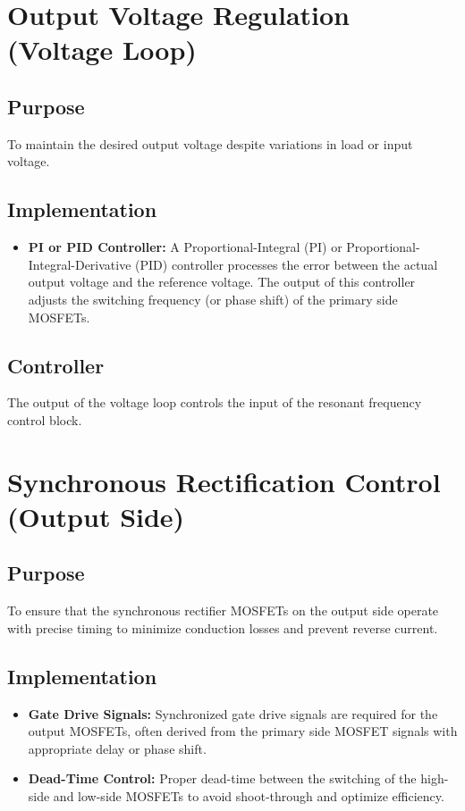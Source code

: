 \documentclass{article}
\begin{document}
\section{Output Voltage Regulation (Voltage Loop)}
\label{sec:output_voltage_regulation}
\subsection{Purpose}
To maintain the desired output voltage despite variations in load or input voltage.

\subsection{Implementation}
\begin{itemize}
    \item \textbf{PI or PID Controller:} A Proportional-Integral (PI) or Proportional-Integral-Derivative (PID) controller processes the error between the actual output voltage and the reference voltage. The output of this controller adjusts the switching frequency (or phase shift) of the primary side MOSFETs.
\end{itemize}

\subsection{Controller}
The output of the voltage loop controls the input of the resonant frequency control block.

\section{Synchronous Rectification Control (Output Side)}
\label{sec:synchronous_rectification_control}
\subsection{Purpose}
To ensure that the synchronous rectifier MOSFETs on the output side operate with precise timing to minimize conduction losses and prevent reverse current.

\subsection{Implementation}
\begin{itemize}
    \item \textbf{Gate Drive Signals:} Synchronized gate drive signals are required for the output MOSFETs, often derived from the primary side MOSFET signals with appropriate delay or phase shift.
    \item \textbf{Dead-Time Control:} Proper dead-time between the switching of the high-side and low-side MOSFETs to avoid shoot-through and optimize efficiency.
\end{itemize}
\end{document}
